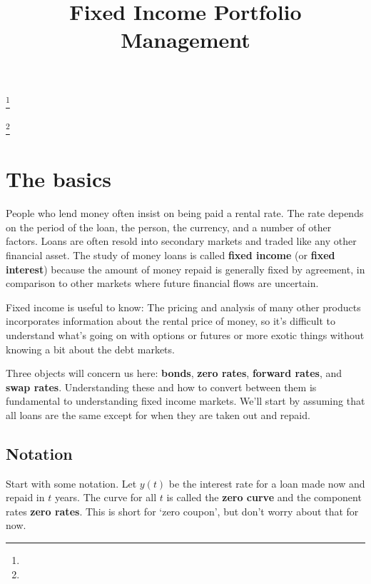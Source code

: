 \documentclass{tran-l}
\theoremstyle{definition}
\theoremstyle{remark}
\numberwithin{equation}{subsection}
\begin{document}
\title[]
 {Fixed Income Portfolio Management}

\author{}

\address{}

\email{}

\thanks{}

\thanks{}

\subjclass{}

\keywords{}

\date{}

\dedicatory{}

\commby{}



\maketitle


\section{The basics}

People who lend money often insist on being paid a rental rate. The rate depends on the period of the loan, the person, the currency, and a number of other factors. Loans are often resold into secondary markets and traded like any other financial asset. The study of money loans is called \textbf{fixed income} (or \textbf{fixed interest}) because the amount of money repaid is generally fixed by agreement, in comparison to other markets where future financial flows are uncertain.

Fixed income is useful to know:  The pricing and analysis of many other products incorporates information about the rental price of money, so it's difficult to understand what's going on with options or futures or more exotic things without knowing a bit about the debt markets.

Three objects will concern us here: \textbf{bonds}, \textbf{zero rates}, \textbf{forward rates}, and \textbf{swap rates}. Understanding these and how to convert between them is fundamental to understanding fixed income markets. We'll start by assuming that all loans are the same except for when they are taken out and repaid.

\subsection{Notation}
Start with some notation. Let $y(t)$ be the interest rate for a loan made now and repaid in $t$ years. The curve for all $t$ is called the \textbf{zero curve} and the component rates \textbf{zero rates}. This is short for `zero coupon', but don't worry about that for now.
\end{document}
